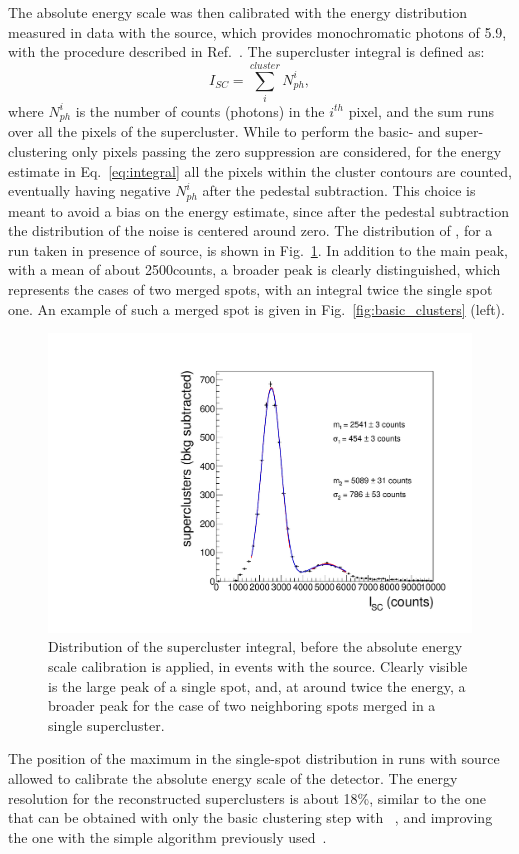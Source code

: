 The absolute energy scale was then calibrated with the energy
distribution measured in data with the \fe source, which provides
monochromatic photons of 5.9\keV, with the procedure described in
Ref.~\cite{bib:fe55}. The supercluster integral is defined as:
\begin{equation}
\label{eq:integral}
I_{SC} = \sum_i^{cluster} N_{ph}^i,
\end{equation}
where $N_{ph}^i$ is the number of counts (photons) in the $i^{th}$
pixel, and the sum runs over all the pixels of the supercluster.
While to perform the basic- and super-clustering only pixels passing
the zero suppression are considered, for the energy estimate in
Eq.~\ref{eq:integral} all the pixels within the cluster contours are
counted, eventually having negative $N_{ph}^i$ after the pedestal
subtraction. This choice is meant to avoid a bias on the energy
estimate, since after the pedestal subtraction the distribution of the
noise is centered around zero.  The distribution of \isclu, for a run
taken in presence of \fe source, is shown in
Fig.~\ref{fig:feuncalibpeak}. In addition to the main peak, with a
mean of about 2500\unit{counts}, a broader peak is clearly
distinguished, which represents the cases of two merged spots, with an
integral twice the single spot one. An example of such a merged spot
is given in Fig.~\ref{fig:basic_clusters} (left).
%
\begin{figure}[ht]
  \begin{center}
    \includegraphics[width=0.49\linewidth]{figures/fe_ucalibintegral_fit}
    \caption{Distribution of the supercluster integral, before the
      absolute energy scale calibration is applied, in events with the
      \fe source. Clearly visible is the large peak of a single spot,
      and, at around twice the energy, a broader peak for the case of
      two neighboring spots merged in a single supercluster.
      \label{fig:feuncalibpeak}}
  \end{center}
\end{figure}
%
 The position of the maximum in the single-spot distribution in runs
with \fe source allowed to calibrate the absolute energy scale of
the \lemon detector.  The energy resolution for the reconstructed \gac
superclusters is about 18\%, similar to the one that can be obtained
with only the basic clustering step with \idbscan~\cite{iDBSCAN}, and
improving the one with the simple \nnc algorithm previously
used~\cite{bib:fe55}.

